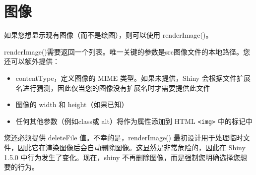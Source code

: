 \section{图像}
如果您想显示现有图像（而不是绘图），则可以使用 renderImage()。

renderImage()需要返回一个列表。唯一关键的参数是src图像文件的本地路径。您还可以额外提供：

\begin{itemize}
    \item contentType，定义图像的 MIME 类型。如果未提供，Shiny 会根据文件扩展名进行猜测，因此仅当您的图像没有扩展名时才需要提供此文件
    \item 图像的 width 和 height（如果已知）
    \item 任何其他参数（例如class或 alt）将作为属性添加到 HTML \verb|<img>|  中的标记中
\end{itemize}

您还必须提供 deleteFile 值。不幸的是，renderImage() 最初设计用于处理临时文件，因此它在渲染图像后会自动删除图像。这显然是非常危险的，因此在 Shiny 1.5.0 中行为发生了变化。现在，shiny 不再删除图像，而是强制您明确选择您想要的行为。